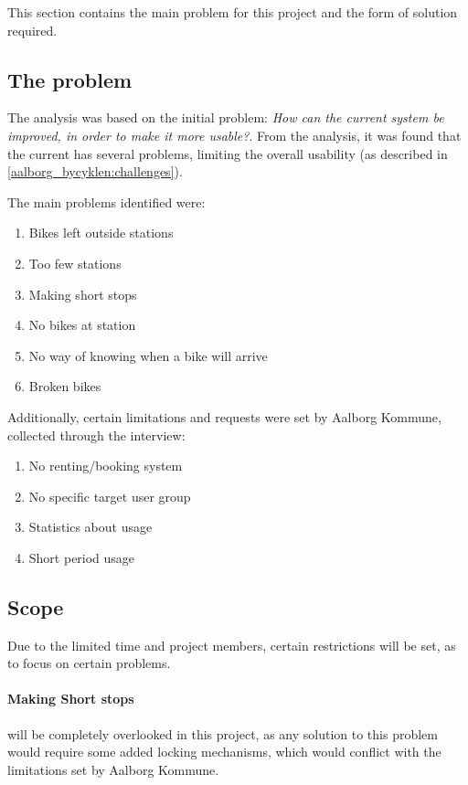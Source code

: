 This section contains the main problem for this project and the form of solution required.

\subsection{The problem}
The analysis was based on the initial problem: \textit{How can the current \citybike system be improved, in order to make it more usable?}.
From the analysis, it was found that the current \citybike has several problems, limiting the overall usability (as described in \cref{aalborg_bycyklen:challenges}).

The main problems identified were:
\begin{enumerate}
\item Bikes left outside stations
\item Too few stations
\item Making short stops
\item No bikes at station
\item No way of knowing when a bike will arrive
\item Broken bikes
\end{enumerate}

Additionally, certain limitations and requests were set by Aalborg Kommune, collected through the interview:

\begin{enumerate}
\item No renting/booking system
\item No specific target user group
\item Statistics about usage
\item Short period usage
\end{enumerate}

\subsection{Scope}
Due to the limited time and project members, certain restrictions will be set, as to focus on certain problems.

\paragraph{Making Short stops} will be completely overlooked in this project, as any solution to this problem would require some added locking mechanisms, which would conflict with the limitations set by Aalborg Kommune.

